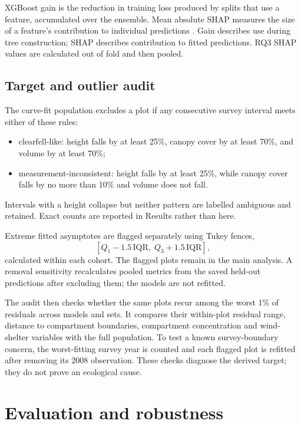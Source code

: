 XGBoost gain is the reduction in training loss produced by splits that use a feature, accumulated
over the ensemble. Mean absolute SHAP measures the size of a feature's contribution to individual
predictions \citep{lundberg2017unified}. Gain describes use during tree construction; SHAP
describes contribution to fitted predictions. RQ3 SHAP values are calculated out of fold and then
pooled.

\subsection{Target and outlier audit}

The curve-fit population excludes a plot if any consecutive survey interval meets either of these
rules:
\begin{itemize}
\setlength\itemsep{0pt}
\item clearfell-like: height falls by at least 25\%, canopy cover by at least 70\%, and volume by
at least 70\%;
\item measurement-inconsistent: height falls by at least 25\%, while canopy cover falls by no more
than 10\% and volume does not fall.
\end{itemize}
Intervals with a height collapse but neither pattern are labelled ambiguous and retained. Exact
counts are reported in Results rather than here.

Extreme fitted asymptotes are flagged separately using Tukey fences,
\begin{equation}
\left[Q_1-1.5\,\mathrm{IQR},\;Q_3+1.5\,\mathrm{IQR}\right],
\label{eq:tukey-fences}
\end{equation}
calculated within each cohort. %
The flagged plots remain in the main analysis. A removal sensitivity recalculates pooled metrics
from the saved held-out predictions after excluding them; the models are not refitted.

The audit then checks whether the same plots recur among the worst 1\% of residuals across models
and sets. It compares their within-plot residual range, distance to compartment boundaries,
compartment concentration and wind-shelter variables with the full population. To test a known
survey-boundary concern, the worst-fitting survey year is counted and each flagged plot is refitted
after removing its 2008 observation. These checks diagnose the derived target; they do not prove
an ecological cause.

\section{Evaluation and robustness}
\label{sec:evaluation}

